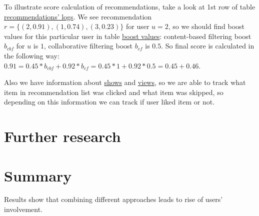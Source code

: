 \documentclass{article}
\begin{document}
    To illustrate score calculation of recommendations, take a look at 1st row of table \hyperref[tab:recommendation_logs]{recommendations' logs}. We see recommendation $r = \{(2, 0.91), (1, 0.74), (3, 0.23)\}$ for user $u = 2$, so we should find boost values for this particular user in table \hyperref[tab:boost_values]{boost values}: content-based filtering boost $b_{cbf}$ for $u$ is $1$, collaborative filtering boost $b_{cf}$ is $0.5$. So final score is calculated in the following way: $0.91 = 0.45 * b_{cbf} + 0.92 * b_{cf} = 0.45 * 1 + 0.92 * 0.5 = 0.45 + 0.46$.

    Also we have information about \hyperref[tab:show]{shows} and \hyperref[tab:view]{views}, so we are able to track what item in recommendation list was clicked and what item was skipped, so depending on this information we can track if user liked item or not.





\section{Further research}
\label{sec:further}

\section{Summary}
\label{sec:summary}

    Results show that combining different approaches leads to rise of users' involvement.

    


  
\end{document}
